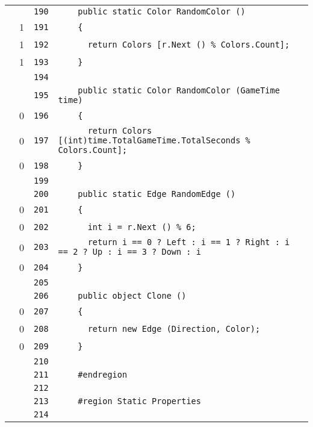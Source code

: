 \documentclass[a4paper,10pt]{article}
\begin{document}
\begin{longtable}[l]{lrrl}
\cellcolor{gray} &  & \verb~190~ & \verb~    public static Color RandomColor ()~\\
\cellcolor{green} & 1 & \verb~191~ & \verb~    {~\\
\cellcolor{green} & 1 & \verb~192~ & \verb~      return Colors [r.Next () % Colors.Count];~\\
\cellcolor{green} & 1 & \verb~193~ & \verb~    }~\\
\cellcolor{gray} &  & \verb~194~ & \verb~~\\
\cellcolor{gray} &  & \verb~195~ & \verb~    public static Color RandomColor (GameTime time)~\\
\cellcolor{red} & 0 & \verb~196~ & \verb~    {~\\
\cellcolor{red} & 0 & \verb~197~ & \verb~      return Colors [(int)time.TotalGameTime.TotalSeconds % Colors.Count];~\\
\cellcolor{red} & 0 & \verb~198~ & \verb~    }~\\
\cellcolor{gray} &  & \verb~199~ & \verb~~\\
\cellcolor{gray} &  & \verb~200~ & \verb~    public static Edge RandomEdge ()~\\
\cellcolor{red} & 0 & \verb~201~ & \verb~    {~\\
\cellcolor{red} & 0 & \verb~202~ & \verb~      int i = r.Next () % 6;~\\
\cellcolor{red} & 0 & \verb~203~ & \verb~      return i == 0 ? Left : i == 1 ? Right : i == 2 ? Up : i == 3 ? Down : i ~\\
\cellcolor{red} & 0 & \verb~204~ & \verb~    }~\\
\cellcolor{gray} &  & \verb~205~ & \verb~~\\
\cellcolor{gray} &  & \verb~206~ & \verb~    public object Clone ()~\\
\cellcolor{red} & 0 & \verb~207~ & \verb~    {~\\
\cellcolor{red} & 0 & \verb~208~ & \verb~      return new Edge (Direction, Color);~\\
\cellcolor{red} & 0 & \verb~209~ & \verb~    }~\\
\cellcolor{gray} &  & \verb~210~ & \verb~~\\
\cellcolor{gray} &  & \verb~211~ & \verb~    #endregion~\\
\cellcolor{gray} &  & \verb~212~ & \verb~~\\
\cellcolor{gray} &  & \verb~213~ & \verb~    #region Static Properties~\\
\cellcolor{gray} &  & \verb~214~ & \verb~~\\

\end{longtable}
\end{document}
